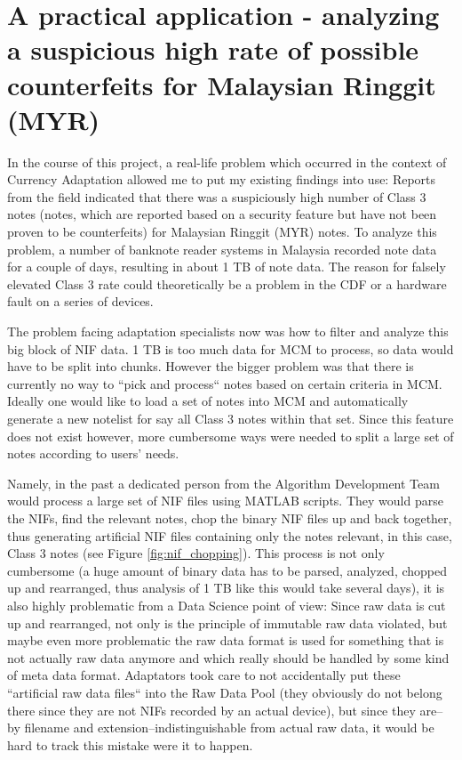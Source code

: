 \section{A practical application - analyzing a suspicious high rate of possible counterfeits for Malaysian Ringgit (MYR)}
In the course of this project, a real-life problem which occurred in the context of Currency Adaptation allowed me to put my existing findings into use: 
Reports from the field indicated that there was a suspiciously high number of Class 3 notes (notes, which are reported based on a security feature but have not been proven to be counterfeits) for Malaysian Ringgit (MYR) notes. To analyze this problem, a number of banknote reader systems in Malaysia recorded note data for a couple of days, resulting in about 1 TB of note data. 
The reason for falsely elevated Class 3 rate could theoretically be a problem in the CDF or a hardware fault on a series of devices. \par
The problem facing adaptation specialists now was how to filter and analyze this big block of NIF data. 1 TB is too much data for MCM to process, so data would have to be split into chunks. However the bigger problem was that there is currently no way to ``pick and process`` notes based on certain criteria in MCM. Ideally one would like to load a set of notes into MCM and automatically generate a new notelist for say all Class 3 notes within that set. Since this feature does not exist however, more cumbersome ways were needed to split a large set of notes according to users' needs. \par 
Namely, in the past a dedicated person from the Algorithm Development Team would process a large set of NIF files using MATLAB scripts. They would parse the NIFs, find the relevant notes, chop the binary NIF files up and back together, thus generating artificial NIF files containing only the notes relevant, in this case, Class 3 notes (see Figure \ref{fig:nif_chopping}). This process is not only cumbersome (a huge amount of binary data has to be parsed, analyzed, chopped up and rearranged, thus analysis of 1 TB like this would take several days), it is also highly problematic from a Data Science point of view: Since raw data is cut up and rearranged, not only is the principle of immutable raw data violated, but maybe even more problematic the raw data format is used for something that is not actually raw data anymore and which really should be handled by some kind of meta data format. Adaptators took care to not accidentally put these ``artificial raw data files`` into the Raw Data Pool  (they obviously do not belong there since they are not NIFs recorded by an actual device), but since they are--by filename and extension--indistinguishable from actual raw data, it would be hard to track this mistake were it to happen. \par
